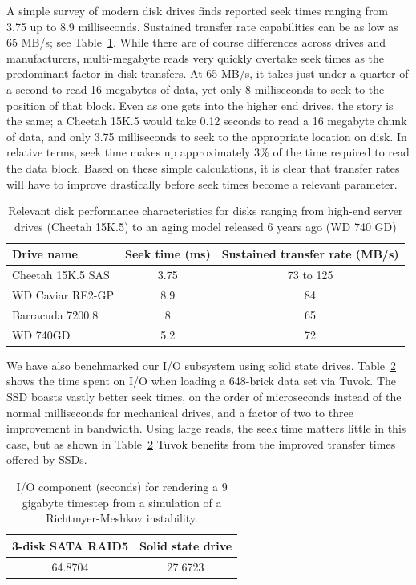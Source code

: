 A simple survey of modern disk drives finds reported seek
times ranging from 3.75 up to 8.9 milliseconds. Sustained
transfer rate capabilities can be as low as 65 MB/s; see
Table~\ref{tbl:disks}.  While there are of course differences across
drives and manufacturers, multi-megabyte reads very quickly overtake
seek times as the predominant factor in disk transfers. At 65 MB/s, it
takes just under a quarter of a second to read 16 megabytes of data,
yet only 8 milliseconds to seek to the position of that block. Even as
one gets into the higher end drives, the story is the same; a Cheetah
15K.5 would take 0.12 seconds to read a 16 megabyte chunk of data, and
only 3.75 milliseconds to seek to the appropriate location on disk.
In relative terms, seek time makes up approximately 3\% of the time
required to read the data block. Based on these simple calculations,
it is clear that transfer rates will have to improve drastically before
seek times become a relevant parameter.

\begin{table}
	\begin{center}
	\begin{tabular}{l|cc}
	\textbf{Drive name} & \textbf{Seek time (ms)} &
		\textbf{Sustained transfer rate (MB/s)}\\\hline
	Cheetah 15K.5 SAS & 3.75 & 73 to 125\\
	WD Caviar RE2-GP & 8.9 & 84\\
	Barracuda 7200.8 & 8 & 65\\
	WD 740GD & 5.2 & 72\\
	\end{tabular}
	\end{center}

  \caption{Relevant disk performance characteristics for disks ranging
  from high-end server drives (Cheetah 15K.5) to an aging model
  released 6 years ago (WD 740 GD)}
	\label{tbl:disks}
\end{table}

We have also benchmarked our I/O subsystem using solid
state drives. Table~\ref{tbl:ssd} shows the time spent on I/O when
loading a 648-brick data set via Tuvok. The SSD boasts vastly better
seek times, on the order of microseconds instead of the normal
milliseconds for mechanical drives, and a factor of two to three
improvement in bandwidth. Using large reads, the seek time matters
little in this case, but as shown in Table~\ref{tbl:ssd} Tuvok benefits
from the improved transfer times offered by SSDs.

\begin{table}
	\begin{center}
	\begin{tabular}{|c|c|}\hline
	\textbf{3-disk SATA RAID5} & \textbf{Solid state drive}\\\hline
	64.8704 & 27.6723\\\hline
	\end{tabular}
	\end{center}

  \caption{I/O component (seconds) for rendering a 9 gigabyte timestep
  from a simulation of a Richtmyer-Meshkov instability.}
	\label{tbl:ssd}
\end{table}

